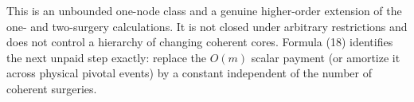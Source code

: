 This is an unbounded one-node class and a genuine higher-order extension of
the one- and two-surgery calculations.  It is not closed under arbitrary
restrictions and does not control a hierarchy of changing coherent cores.  Formula
(18) identifies the next unpaid step exactly: replace the $O(m)$ scalar
payment (or amortize it across physical pivotal events) by a constant
independent of the number of coherent surgeries.
